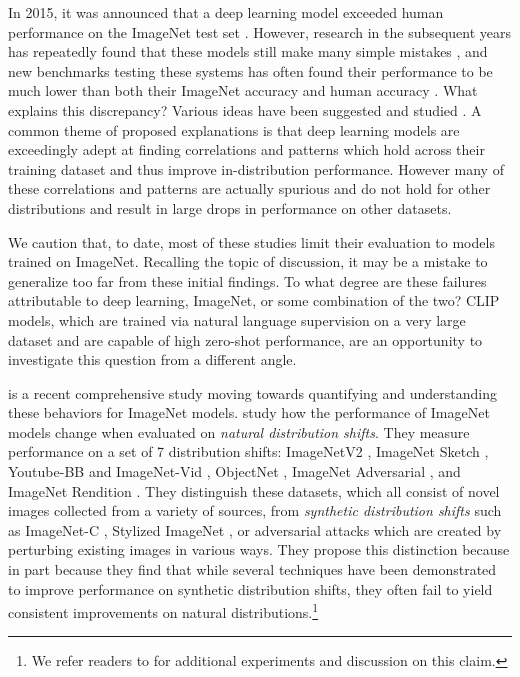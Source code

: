 \documentclass{article}
\begin{document}
In 2015, it was announced that a deep learning model exceeded human performance on the ImageNet test set \citep{he2015delving}. However, research in the subsequent years has repeatedly found that these models still make many simple mistakes \citep{dodge2017study,geirhos2018imagenet,alcorn2019strike}, and new benchmarks testing these systems has often found their performance to be much lower than both their ImageNet accuracy and human accuracy \citep{recht2019imagenet,barbu2019objectnet}. What explains this discrepancy? Various ideas have been suggested and studied \citep{ilyas2019adversarial,geirhos2020shortcut}. A common theme of proposed explanations is that deep learning models are exceedingly adept at finding correlations and patterns which hold across their training dataset and thus improve in-distribution performance. However many of these correlations and patterns are actually spurious and do not hold for other distributions and result in large drops in performance on other datasets.

We caution that, to date, most of these studies limit their evaluation to models trained on ImageNet. Recalling the topic of discussion, it may be a mistake to generalize too far from these initial findings. To what degree are these failures attributable to deep learning, ImageNet, or some combination of the two? CLIP models, which are trained via natural language supervision on a very large dataset and are capable of high zero-shot performance, are an opportunity to investigate this question from a different angle.



\citet{taori2020measuring} is a recent comprehensive study moving towards quantifying and understanding these behaviors for ImageNet models. \citet{taori2020measuring} study how the performance of ImageNet models change when evaluated on \textit{natural distribution shifts}. They measure performance on a set of 7 distribution shifts: ImageNetV2 \citep{recht2019imagenet}, ImageNet Sketch \citep{wang2019learning}, Youtube-BB and ImageNet-Vid \citep{shankar2019image}, ObjectNet \citep{barbu2019objectnet}, ImageNet Adversarial \citep{hendrycks2019natural}, and ImageNet Rendition \citep{hendrycks2020many}. They distinguish these datasets, which all consist of novel images collected from a variety of sources, from \textit{synthetic distribution shifts} such as ImageNet-C \citep{hendrycks2019benchmarking}, Stylized ImageNet \citep{geirhos2018imagenet}, or adversarial attacks \citep{goodfellow2014explaining} which are created by perturbing existing images in various ways. They propose this distinction because in part because they find that while several techniques have been demonstrated to improve performance on synthetic distribution shifts, they often fail to yield consistent improvements on natural distributions.\footnote{We refer readers to \citet{hendrycks2020many} for additional experiments and discussion on this claim.}
\end{document}
